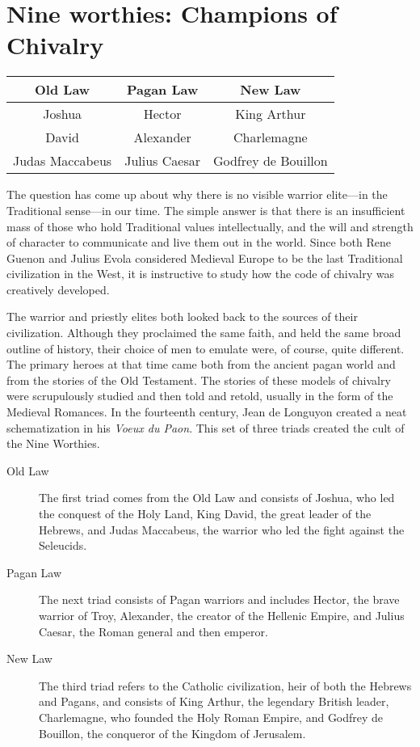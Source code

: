 \section{Nine worthies: Champions of Chivalry}

\label{sec:NineWorthies}

\begin{table}[h]\centering\small
\begin{tabular}{ccc}\toprule
\textbf{Old Law} & \textbf{Pagan Law} & \textbf{New Law}\\\midrule
Joshua & Hector & King Arthur\\
David & Alexander & Charlemagne\\
Judas Maccabeus & Julius Caesar & Godfrey de Bouillon\\\bottomrule
\end{tabular}
\end{table}
The question has come up about why there is no visible warrior elite—in the Traditional sense—in our time. The simple answer is that there is an insufficient mass of those who hold Traditional values intellectually, and the will and strength of character to communicate and live them out in the world. Since both Rene Guenon and Julius Evola considered Medieval Europe to be the last Traditional civilization in the West, it is instructive to study how the code of chivalry was creatively developed. 

The warrior and priestly elites both looked back to the sources of their civilization. Although they proclaimed the same faith, and held the same broad outline of history, their choice of men to emulate were, of course, quite different. The primary heroes at that time came both from the ancient pagan world and from the stories of the Old Testament. The stories of these models of chivalry were scrupulously studied and then told and retold, usually in the form of the Medieval Romances. In the fourteenth century, Jean de Longuyon created a neat schematization in his \emph{Voeux du Paon}. This set of three triads created the cult of the Nine Worthies. 

\begin{description}
\item[Old Law ] The first triad comes from the Old Law and consists of Joshua, who led the conquest of the Holy Land, King David, the great leader of the Hebrews, and Judas Maccabeus, the warrior who led the fight against the Seleucids.

\item[Pagan Law ] The next triad consists of Pagan warriors and includes Hector, the brave warrior of Troy, Alexander, the creator of the Hellenic Empire, and Julius Caesar, the Roman general and then emperor.

\item[New Law ] The third triad refers to the Catholic civilization, heir of both the Hebrews and Pagans, and consists of King Arthur, the legendary British leader, Charlemagne, who founded the Holy Roman Empire, and Godfrey de Bouillon, the conqueror of the Kingdom of Jerusalem.
\end{description}


